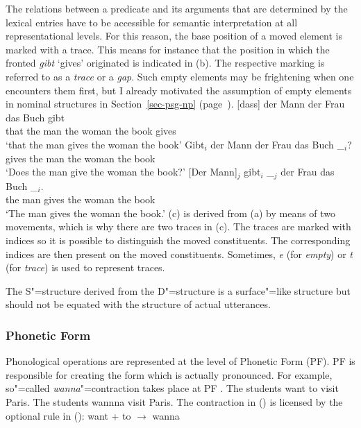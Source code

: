 The relations between a predicate and its arguments that are determined by the lexical entries have to be accessible for semantic interpretation at all 
representational levels. For this reason, the base position of a moved element is marked with a
trace. This means for instance that the position in which the
fronted \emph{gibt} `gives' originated is indicated in (b). The respective marking is
referred to as a \emph{trace} or a \emph{gap}. Such empty elements may be
frightening when one encounters them first, but I already motivated the assumption
of empty elements in nominal structures in Section~\ref{sec-psg-np}  (page~\pageref{np-epsilon}). 
\eal
\ex 
\gll {}[dass] der Mann der Frau das Buch gibt\\
	 {}\spacebr{}that the man the woman the book gives\\
\glt `that the man gives the woman the book'
\ex 
\gll Gibt$_i$ der Mann der Frau das Buch \_$_i$?\\
	 gives the man the woman the book\\
\glt `Does the man give the woman the book?'
\ex 
\gll {}[Der Mann]$_j$ gibt$_i$ \_$_j$ der Frau das Buch \_$_i$.\\
	 {}\spacebr{}the man gives {} the woman the book\\
\glt `The man gives the woman the book.'
\zl
(c) is derived from (a) by means of two movements, which is why there are two traces in (c). The traces are marked with
indices so it is possible to distinguish the moved constituents. The corresponding indices are then present on the moved constituents. Sometimes,
\emph{e} (for \emph{empty}) or \emph{t} (for \emph{trace}) is used to represent traces.

The S"=structure derived from the D"=structure is a surface"=like structure but should not be equated with the structure of actual utterances.

\subsubsection{Phonetic Form}

Phonological operations are represented at the level of Phonetic Form (PF). PF is responsible for creating the form which
is actually pronounced. For example, so"=called \emph{wanna}"=contraction takes place at PF \citep[--21]{Chomsky81a}.
\eal
\ex The students want to visit Paris.
\ex The students wannna visit Paris.
\zl
The contraction in () is licensed by the optional rule in ():
\ea
want + to $\to$ wanna
\z
{}

